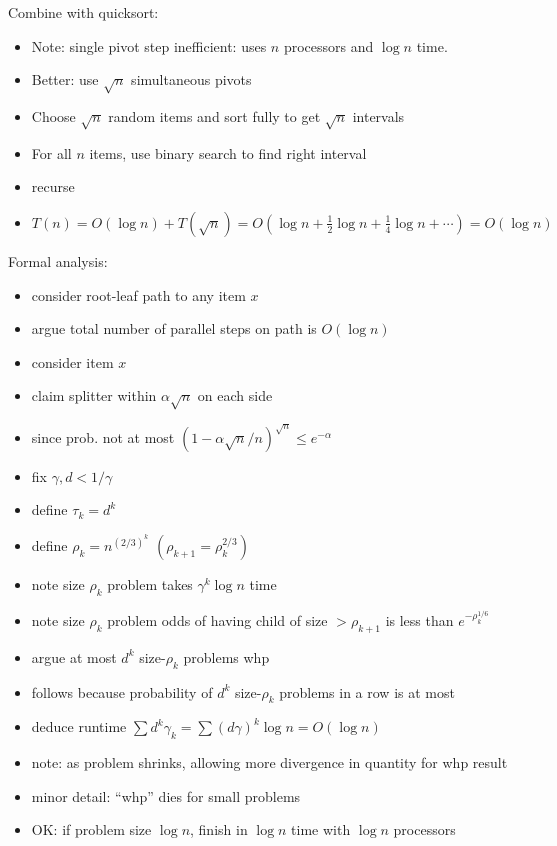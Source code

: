 \documentclass[12pt]{article}
\begin{document}
Combine with quicksort:
\begin{itemize}
\item Note: single pivot step inefficient: uses $n$ processors and
  $\log n$ time.
\item Better: use $\sqrt{n}$ simultaneous pivots
\item Choose $\sqrt{n}$ random items and sort fully to get $\sqrt{n}$ intervals
\item For all $n$ items, use binary search to find right interval
\item recurse
\item $T(n)=O(\log n)+T(\sqrt{n})=O(\log n + \frac12\log n+\frac14\log
  n + \cdots)=O(\log n)$
\end{itemize}

Formal analysis:
\begin{itemize}
\item consider root-leaf path to any item $x$
\item argue total number of parallel steps on path is $O(\log n)$
\item consider item $x$
\item claim splitter within $\alpha\sqrt{n}$ on each side
\item since prob. not at most $(1-\alpha\sqrt{n}/n)^{\sqrt{n}} \le
  e^{-\alpha}$
\item fix $\gamma, d<1/\gamma$
\item define $\tau_k = d^k$
\item define $\rho_k = n^{(2/3)^k}$ $(\rho_{k+1}=\rho_k^{2/3})$
\item note size $\rho_k$ problem takes $\gamma^k\log n$ time
\item note size $\rho_k$ problem odds of having child of size
  $>\rho_{k+1}$ is less than $e^{-\rho_k^{1/6}}$
\item argue at most $d^k$ size-$\rho_k$ problems whp
\item follows because probability of $d^k$ size-$\rho_k$ problems in a
  row is at most 
\item deduce runtime $\sum d^k\gamma_k = \sum (d\gamma)^{k}\log n =
  O(\log n)$ 
\item note: as problem shrinks, allowing more divergence in quantity
  for whp result
\item minor detail: ``whp'' dies for small problems
\item OK: if problem size $\log n$, finish in $\log n$ time with $\log
  n$ processors
\end{itemize}
\end{document}
